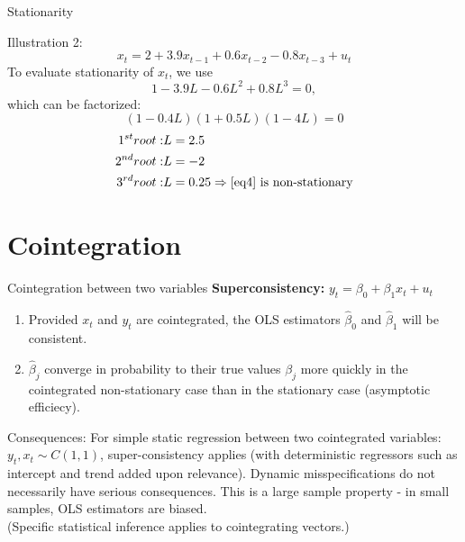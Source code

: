 \documentclass{beamer}
\begin{document}

\begin{frame}{Stationarity}
\begin{block}{Illustration 2:}
\begin{equation}
x_t   = 2 + 3.9 x_{t-1} + 0.6 x_{t-2} - 0.8 x_{t-3} + u_t \label{eq4}
\end{equation}
To evaluate stationarity of $x_t$, we use
\begin{equation*}
1-3.9 L - 0.6 L^2 + 0.8 L^3  = 0 , 
\end{equation*}
which can be factorized:
$$ (1-0.4L)(1+0.5L)(1-4L) =0 $$
\vspace{-0.5cm}
\begin{align} \notag
1^{st} root: & L = 2.5 \\ \notag
2^{nd} root: & L =-2 \\ \notag
3^{rd} root: & L = 0.25 \Rightarrow \textnormal{\eqref{eq4}  is non-stationary}
\end{align}
\end{block}
\end{frame}


\section{Cointegration}

\begin{frame}{Cointegration between two variables}
\textbf{Superconsistency:} $y_t =  \beta_0 + \beta_1 x_t + u_t$\\
\begin{enumerate}
\item Provided $x_t$ and $y_t$ are cointegrated, the OLS estimators $\hat{\beta}_0$ and $\hat{\beta}_1$ will be consistent. 
\item $\hat{\beta}_j$ converge in probability to their true values $\beta_j$ more quickly in the cointegrated non-stationary case than in the stationary case (asymptotic efficiecy).
\end{enumerate}
\begin{block}{Consequences:}
For simple static regression between two cointegrated variables: $y_t, x_t \sim C(1,1)$, super-consistency applies (with deterministic regressors such as intercept and trend added upon relevance). Dynamic misspecifications do not necessarily have serious consequences. This is a large sample property - in small samples, OLS estimators are biased.\\ (Specific statistical inference applies to cointegrating vectors.)
\end{block}
\end{frame}
\end{document}
